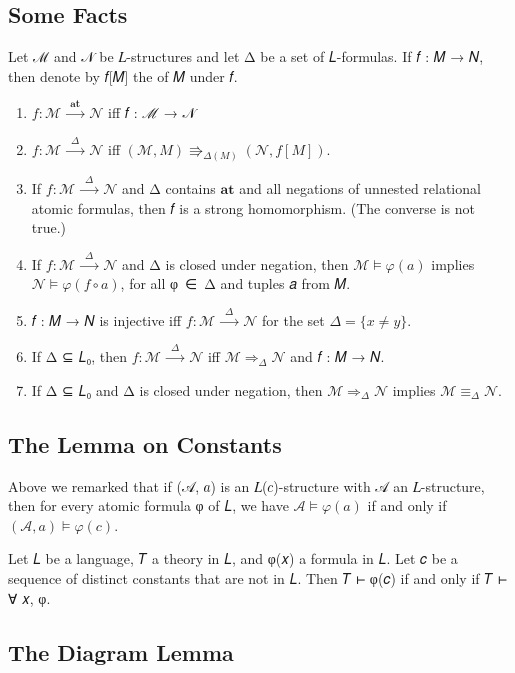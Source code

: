 \documentclass[a4paper,UKenglish,cleveref,autoref,thm-restate,12pt]{lipics-v2021-wjd}
\newcommand{\<}{\langle}
\renewcommand{\>}{\rangle}
\begin{document}
\subsection{Some Facts}\label{some-facts}
Let ℳ and 𝒩 be 𝐿-structures and let Δ be a set of 𝐿-formulas.  If 𝑓 : 𝑀 → 𝑁,
then denote by 𝑓[𝑀] the  of 𝑀 under 𝑓.
\begin{enumerate}
\item 
  \(f : ℳ \stackrel{\mathbf{at}}{⟶} 𝒩\) iff 𝑓 : ℳ → 𝒩
\item 
 \(f : ℳ \stackrel{Δ}{⟶} 𝒩\) iff \((ℳ, M) \Rrightarrow_{Δ(M)} (𝒩, f[M])\).
\item If \(f : ℳ \stackrel{Δ}{⟶} 𝒩\) and Δ contains \(\mathbf{at}\) and all
  negations of unnested relational atomic formulas, then 𝑓 is a strong
  homomorphism. (The converse is not true.)
\item If \(f : ℳ \stackrel{Δ}{⟶} 𝒩\) and Δ is closed under negation, then
  \(ℳ \models φ(𝑎)\) implies \(𝒩 \models φ(𝑓 ∘ 𝑎)\), for all φ~∈~Δ and tuples 𝑎 from 𝑀.
\item 𝑓 : 𝑀 → 𝑁 is injective iff \(f : ℳ \stackrel{Δ}{⟶} 𝒩\)
for the set \(Δ = \{x \neq y\}\).
\item If Δ ⊆ 𝐿₀, then \(f : ℳ \stackrel{Δ}{⟶} 𝒩\) iff \(ℳ ⇒_Δ 𝒩\) and
𝑓 : 𝑀 → 𝑁.
\item If Δ ⊆ 𝐿₀ and Δ is closed under negation, then \(ℳ ⇒_Δ 𝒩\) implies \(ℳ ≡_Δ 𝒩\).
\end{enumerate}


\subsection{The Lemma on Constants}\label{the-lemma-on-constants}

Above we remarked that if (𝒜, 𝑎) is an 𝐿(𝑐)-structure with 𝒜 an 𝐿-structure,
then for every atomic formula φ of 𝐿, we have \(𝒜 \models φ(𝑎)\) if and only if \((𝒜, 𝑎) \models φ(𝑐)\).

\begin{lemma} Let 𝐿 be a language, 𝑇 a
theory in 𝐿, and φ(𝑥) a formula in 𝐿. Let 𝑐 be a sequence of distinct constants
that are not in 𝐿. Then 𝑇 ⊢ φ(𝑐) if and only if 𝑇 ⊢ ∀ 𝑥, φ.
\end{lemma}

\subsection{The Diagram Lemma}\label{the-diagram-lemma}
\end{document}
